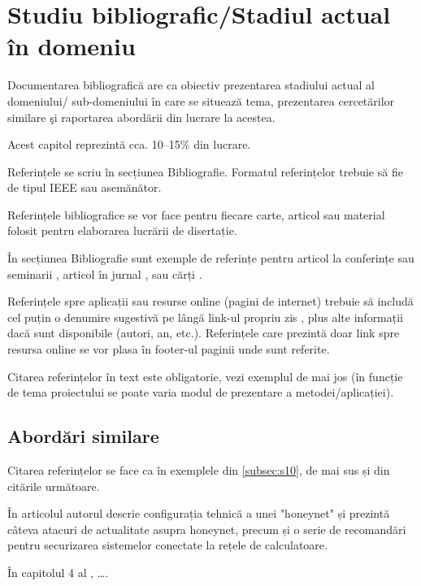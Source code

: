 \chapter{Studiu bibliografic/Stadiul actual în domeniu}

Documentarea bibliografică are ca obiectiv prezentarea stadiului actual al domeniului/ sub-domeniului în care se situează tema, prezentarea cercetărilor similare şi raportarea abordării din lucrare la acestea. 

Acest capitol reprezintă cca. 10--15\% din lucrare.

Referințele se scriu în secțiunea Bibliografie. Formatul referințelor trebuie să fie de tipul IEEE sau asemănător. 

Referințele bibliografice se vor face pentru fiecare carte, articol sau material folosit pentru elaborarea lucrării de disertație. 

În secțiunea Bibliografie sunt exemple de referințe pentru articol la conferințe sau seminarii  \cite{Zhou04}, articol în jurnal \cite{Antoniou04}, sau cărți \cite{strunk}. 

Referințele spre aplicații sau resurse online (pagini de internet) trebuie să includă cel puțin o denumire sugestivă pe lângă link-ul propriu zis \cite{webpage}, plus alte informații dacă sunt disponibile (autori, an, etc.). Referințele care prezintă doar link spre resursa online se vor plasa în footer-ul paginii unde sunt referite.

Citarea referințelor în text este obligatorie, vezi exemplul de mai jos (în funcție de tema proiectului se poate varia modul de prezentare a metodei/aplicației).

\section{Abordări similare}

Citarea referințelor se face ca în exemplele din \ref{subsec:s10}, de mai sus și din citările următoare.

În articolul \cite{Antoniou04} autorul descrie configurația tehnică a unei "honeynet" și prezintă câteva atacuri de actualitate asupra honeynet, precum și o serie de recomandări pentru securizarea sistemelor conectate la rețele de calculatoare.

În capitolul 4 al \cite{strunk}, \dots.







